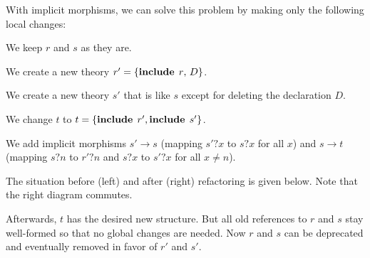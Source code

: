 With implicit morphisms, we can solve this problem by making only the following local changes:
\begin{compactenum}
  \item We keep $r$ and $s$ as they are.
  \item We create a new theory $r'=\{\operatorname{\mathbf{include}}{\;r},\,D\}$.
  \item We create a new theory $s'$ that is like $s$ except for deleting the declaration $D$.
  \item We change $t$ to $t=\{\operatorname{\mathbf{include}}{\;r'},\operatorname{\mathbf{include}}{\;s'}\}$.
  \item We add implicit morphisms $s'\to s$ (mapping $s'?x$ to $s?x$ for all $x$) and $s\to t$ (mapping $s?n$ to $r'?n$ and $s?x$ to $s'?x$ for all $x\neq n$).
\end{compactenum}
The situation before (left) and after (right) refactoring is given below.
Note that the right diagram commutes.
\begin{center}
\tb
{}
\end{center}
Afterwards, $t$ has the desired new structure.
But all old references to $r$ and $s$ stay well-formed so that no global changes are needed.
Now $r$ and $s$ can be deprecated and eventually removed in favor of $r'$ and $s'$.
